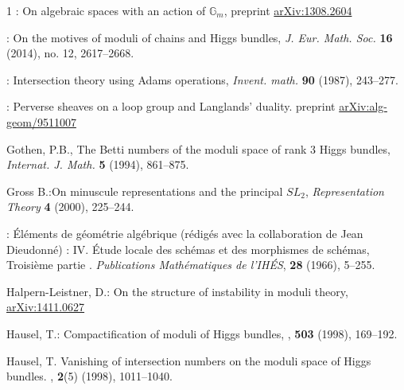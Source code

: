 \documentclass[12pt]{article}
\numberwithin{equation}{section}
\theoremstyle{remark}
\theoremstyle{definition}
\numberwithin{theorem}{section}
\renewcommand{\1}{\mathbbm{1}}
\begin{document}
\begin{thebibliography}{1}
	: On algebraic spaces with an action of ${\mathbb G}_m$, preprint  \href{https://arxiv.org/abs/1308.2604}{arXiv:1308.2604}



	:
	On the motives of moduli of chains and Higgs bundles, {\em 
	J. Eur. Math. Soc.} {\bf 16} (2014), no. 12, 2617--2668. 
	
:	Intersection theory using Adams operations, {\em Invent. math.} {\bf 90} (1987), 243--277. 
	
: Perverse sheaves on a loop group and Langlands' duality. preprint \href{https://arxiv.org/abs/alg-geom/9511007}{arXiv:alg-geom/9511007}
	
	 {\sc Gothen,  P.B.}, The Betti numbers of the moduli space
	of rank $3$ Higgs bundles, {\em Internat. J. Math.} {\bf 5} (1994), 861--875.
	

{\sc Gross B.}:{On minuscule representations and the principal $SL_2$}, {\em Representation Theory} {\bf 4} (2000), 225--244.

: \'El\'ements de g\'eom\'etrie alg\'ebrique 
(r\'edig\'es avec la collaboration de Jean Dieudonn\'e) : IV. \'Etude locale des sch\'emas et des morphismes de sch\'emas, Troisi\`eme partie
. {\em Publications Math\'ematiques de l'IH\'ES}, {\bf 28} (1966), 5--255.


 {\sc Halpern-Leistner, D.}: On the structure of instability in moduli theory, \href{https://arxiv.org/abs/1411.0627}{arXiv:1411.0627}

{\sc Hausel, T.}:
\newblock Compactification of moduli of {H}iggs bundles,
, {\bf 503} (1998), 169--192.



{\sc Hausel, T.}
\newblock Vanishing of intersection numbers on the moduli space of {H}iggs
  bundles.
, {\bf 2}(5) (1998), 1011--1040.


\end{thebibliography}
\end{document}
